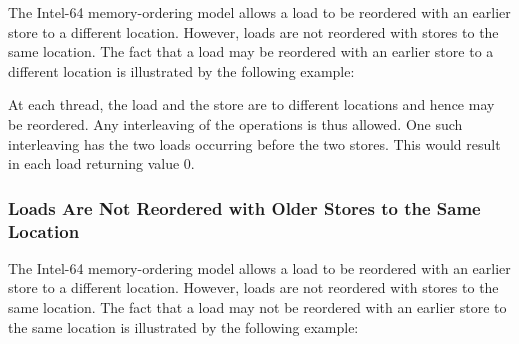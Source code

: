The Intel-64 memory-ordering model allows a load to be reordered with an earlier store to a different location.
However, loads are not reordered with stores to the same location.
\bigbreak
\noindent
The fact that a load may be reordered with an earlier store to a different location is illustrated by the following example:

\begin{table}[!hbt]
\noindent{}
\caption[Loads May be Reordered with Older Stores]{Loads May be Reordered with Older Stores \cite[Example 8-3]{ref:Intel}}
\label{tbl:litmus:intel:3}
\end{table}

\noindent
At each thread, the load and the store are to different locations and hence may be reordered.
Any interleaving of the operations is thus allowed.
One such interleaving has the two loads occurring before the two stores.
This would result in each load returning value 0.

\newpage

\subsubsection*{Loads Are Not Reordered with Older Stores to the Same Location}

The Intel-64 memory-ordering model allows a load to be reordered with an earlier store to a different location.
However, loads are not reordered with stores to the same location.
\bigbreak
\noindent
The fact that a load may not be reordered with an earlier store to the same location is illustrated by the following
example:


